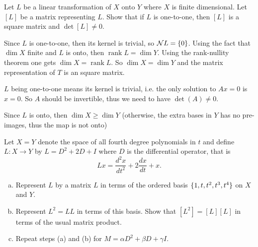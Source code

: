 \begin{problem}
	Let $ L $ be a linear transformation of $ X $ onto $ Y $ where $ X $ is finite dimensional. Let $ [L] $ be a matrix representing $ L $. Show that if $ L $ is one-to-one, then $ [L] $ is a square matrix and $ \det[L]\neq 0 $.
\end{problem}
\begin{solution}
	Since $ L $ is one-to-one, then its kernel is trivial, so $ \mathcal{N}L = \{0\} $. Using the fact that $ \dim X $ finite and $ L $ is onto, then $ \operatorname{rank} L = \dim Y $. Using the rank-nullity theorem one gets $ \dim X = \operatorname{rank} L $. So $ \dim X = \dim Y $ and the matrix representation of $ T $ is an square matrix.
	
	$ L $ being one-to-one means its kernel is trivial, i.e. the only solution to $ Ax = 0 $ is $ x=0 $. So $ A $ should be invertible, thus we need to have $ \det(A) \neq 0 $.
\end{solution}
\begin{remark}
	Since $ L $ is onto, then $ \dim X \geq \dim Y $ (otherwise, the extra bases in $ Y $ has no pre-images, thus the map is not onto)
\end{remark}


\begin{problem}
	Let $ X=Y $ denote the space of all fourth degree polynomials in $ t $ and define $ L: X\to Y $ by $ L=D^2 + 2D + I $ where $ D $ is the differential operator, that is
	\[ Lx = \frac{d^2x}{dt^2} + 2\frac{dx}{dt} + x. \]
	\begin{enumerate}[(a)]
		\item Represent $ L $ by a matrix $ L $ in terms of the ordered basis $ \{1,t,t^2,t^3,t^4\} $ on $ X $ and $ Y $.
		\item Represent $ L^2 = LL $ in terms of this basis. Show that $ [L^2] = [L] [L] $ in terms of the usual matrix product.
		\item Repeat steps (a) and (b) for $ M = \alpha D^2 + \beta D + \gamma I $.
	\end{enumerate}
\end{problem}

